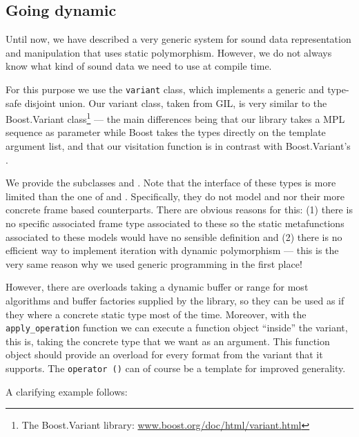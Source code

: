 \subsection{Going dynamic}
\label{sec:ns-sound-end}

Until now, we have described a very
generic system for sound data representation and manipulation that
uses static polymorphism. However, we do not always know what kind of
sound data we need to use at compile time.

For this purpose we use the
\texttt{variant} class, which implements a generic and type-safe
disjoint union. Our variant class, taken from GIL, is very similar to
the Boost.Variant class\footnote{The Boost.Variant library:
  \url{www.boost.org/doc/html/variant.html}} --- the main differences
being that our library takes a MPL sequence as parameter while Boost
takes the types directly on the template argument list, and that our
visitation function is  in contrast with
Boost.Variant's .

We provide the  subclasses  and
. Note that the interface of these
types is more limited than the one of  and
. Specifically, they do not model
 and  nor
their more concrete frame based counterparts. There are obvious
reasons for this: (1) there is no specific associated frame type
associated to these so the static metafunctions associated to these
models would have no sensible definition and (2) there is no efficient
way to implement iteration with dynamic polymorphism --- this is the
very same reason why we used generic programming in the first place!

However, there are overloads taking a dynamic buffer or range for most
algorithms and buffer factories supplied by the library, so they can
be used as if they where a concrete static type most of the
time. Moreover, with the \texttt{apply\_operation} function we can
execute a function object ``inside'' the variant, this is, taking the
concrete type that we want as an argument. This function object should
provide an  overload for every format from the
variant that it supports. The \texttt{operator ()} can of course be a
template for improved generality.

A clarifying example follows:

